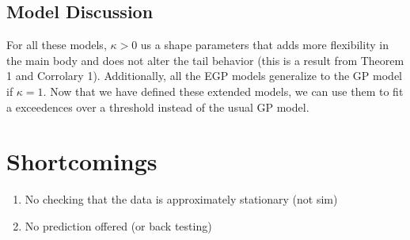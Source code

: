 \documentclass{article}
\theoremstyle{definition}
\theoremstyle{definition}
\def\k{\kappa}
\begin{document}
\subsection{Model Discussion}
For all these models, $\k>0$ us a shape parameters that adds more flexibility in the main body and does not alter the tail behavior (this is a result from Theorem 1 and Corrolary 1). Additionally, all the EGP models generalize to the GP model if $\k=1$. Now that we have defined these extended models, we can use them to fit a exceedences over a threshold instead of the usual GP model. 



\section{Shortcomings}
\begin{enumerate}
    \item No checking that the data is approximately stationary (not sim)
    \item No prediction offered (or back testing)
\end{enumerate}
\end{document}
